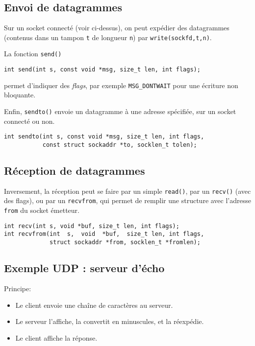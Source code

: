 \subsection{Envoi de datagrammes}

Sur un socket connecté (voir ci-dessus), on peut expédier
des datagrammes (contenus dans un tampon
\texttt{t} de longueur \texttt{n}) par \texttt{write(sockfd,t,n)}.


La fonction \texttt{send()} 

\extrait
\begin{lstlisting}
int send(int s, const void *msg, size_t len, int flags);
\end{lstlisting}

permet d'indiquer des \emph{flags}, par exemple
\texttt{MSG\_DONTWAIT} pour  une écriture non bloquante.


Enfin, \texttt{sendto()} envoie un datagramme à une adresse
spécifiée, sur un socket connecté ou non.



\extrait
\begin{lstlisting}
int sendto(int s, const void *msg, size_t len, int flags,
           const struct sockaddr *to, socklen_t tolen);
           \end{lstlisting}


\subsection{Réception de datagrammes}

Inversement, la réception peut se faire par un simple 
\texttt{read()}, par un \texttt{recv()} (avec des flags), ou
par un \texttt{recvfrom}, qui permet de remplir une structure avec
l'adresse
\texttt{from}
du socket émetteur.

\extrait
\begin{lstlisting}
int recv(int s, void *buf, size_t len, int flags);
int recvfrom(int  s,  void  *buf,  size_t len, int flags,
             struct sockaddr *from, socklen_t *fromlen);
             \end{lstlisting}


\subsection{Exemple UDP : serveur d'écho}

Principe:
\begin{itemize}
\item 
Le client envoie une chaîne de caractères au serveur.
\item 
Le serveur l'affiche, la convertit en minuscules,
et la réexpédie.
\item 
Le client affiche la réponse.
\end{itemize}

